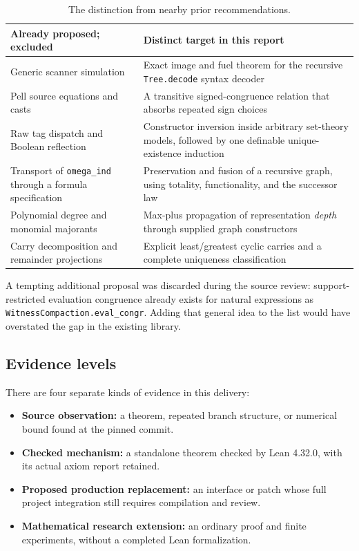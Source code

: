 \documentclass[11pt]{article}
\theoremstyle{remark}\newtheorem{remark}[theorem]{Remark}
\newcommand{\code}[1]{\nolinkurl{#1}}
\begin{document}
\begin{table}[H]
\centering\small
\begin{tabular}{@{}P{45mm}P{106mm}@{}}
\toprule
Already proposed; excluded & Distinct target in this report\\
\midrule
Generic scanner simulation & Exact image and fuel theorem for the recursive \code{Tree.decode} syntax decoder\\
Pell source equations and casts & A transitive signed-congruence relation that absorbs repeated sign choices\\
Raw tag dispatch and Boolean reflection & Constructor inversion inside arbitrary set-theory models, followed by one definable unique-existence induction\\
Transport of \code{omega_ind} through a formula specification & Preservation and fusion of a recursive graph, using totality, functionality, and the successor law\\
Polynomial degree and monomial majorants & Max-plus propagation of representation \emph{depth} through supplied graph constructors\\
Carry decomposition and remainder projections & Explicit least/greatest cyclic carries and a complete uniqueness classification\\
\bottomrule
\end{tabular}
\caption{The distinction from nearby prior recommendations.}
\end{table}

A tempting additional proposal was discarded during the source review: support-restricted evaluation congruence already exists for natural expressions as \code{WitnessCompaction.eval_congr}. Adding that general idea to the list would have overstated the gap in the existing library.

\subsection{Evidence levels}

There are four separate kinds of evidence in this delivery:

\begin{itemize}
\item \textbf{Source observation:} a theorem, repeated branch structure, or numerical bound found at the pinned commit.
\item \textbf{Checked mechanism:} a standalone theorem checked by Lean 4.32.0, with its actual axiom report retained.
\item \textbf{Proposed production replacement:} an interface or patch whose full project integration still requires compilation and review.
\item \textbf{Mathematical research extension:} an ordinary proof and finite experiments, without a completed Lean formalization.
\end{itemize}
\end{document}
